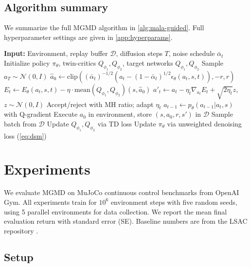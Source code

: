 \documentclass{article}
\theoremstyle{plain}
\theoremstyle{definition}
\theoremstyle{remark}
\begin{document}
\subsection{Algorithm summary}
\label{sec:algorithm}

We summarize the full MGMD algorithm in \cref{alg:mala-guided}.
Full hyperparameter settings are given in \cref{app:hyperparams}.

\begin{algorithm}[t]
\caption{MALA-Guided Mirror Descent (MGMD)}
\label{alg:mala-guided}
\begin{algorithmic}[1]
\STATE \textbf{Input:} Environment, replay buffer $\mathcal{D}$, diffusion steps $T$, noise schedule $\bar{\alpha}_t$
\STATE Initialize policy $\pi_\theta$, twin-critics $Q_{\phi_1}, Q_{\phi_2}$, target networks $Q_{\phi_1}, Q_{\phi_2}$
  \STATE Sample $a_T \sim \mathcal{N}(0, I)$
    \STATE $\hat{a}_0 \leftarrow \text{clip}((\bar{\alpha}_t)^{-1/2}(a_t - (1-\bar{\alpha}_t)^{1/2}\epsilon_\theta(a_t, s, t)), -r, r)$
      \STATE $E_t \leftarrow E_\theta(a_t, s, t) - \eta \cdot \text{mean}(Q_{\phi_1}, Q_{\phi_2})(s, \hat{a}_0)$
      \STATE $a'_t \leftarrow a_t - \eta_t \nabla_{a_t} E_t + \sqrt{2\eta_t} z$, $z \sim \mathcal{N}(0,I)$
      \STATE Accept/reject with MH ratio; adapt $\eta_t$
    \ENDFOR
    \STATE $a_{t-1} \leftarrow p_\theta(a_{t-1} | a_t, s)$ with Q-gradient
  \ENDFOR
  \STATE Execute $a_0$ in environment, store $(s, a_0, r, s')$ in $\mathcal{D}$
    \STATE Sample batch from $\mathcal{D}$
    \STATE Update $Q_{\phi_1}, Q_{\phi_2}$ via TD loss
    \STATE Update $\pi_\theta$ via unweighted denoising loss (\cref{eq:dsm})
  \ENDFOR
\ENDFOR
\end{algorithmic}
\end{algorithm}

\section{Experiments}
\label{sec:experiments}

We evaluate MGMD on MuJoCo continuous control benchmarks from OpenAI Gym.
All experiments train for $10^6$ environment steps with five random seeds, using 5 parallel environments for data collection.
We report the mean final evaluation return with standard error (SE).
Baseline numbers are from the LSAC repository \citep{lsac2025}.

\subsection{Setup}
\end{document}
